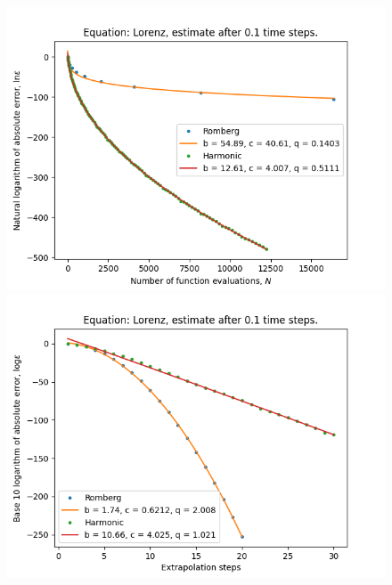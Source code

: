 \begin{figure}[H]
\centering
\begin{minipage}{0.45\textwidth}
\centering
\includegraphics[scale=0.45]{../results/emr_plots/lorenz_hp_trend.png}
\end{minipage}
\begin{minipage}{0.45\textwidth}
\centering
\includegraphics[scale=0.45]{../results/emr_plots/lorenz_hp_steps.png}
\end{minipage}
\end{figure}

